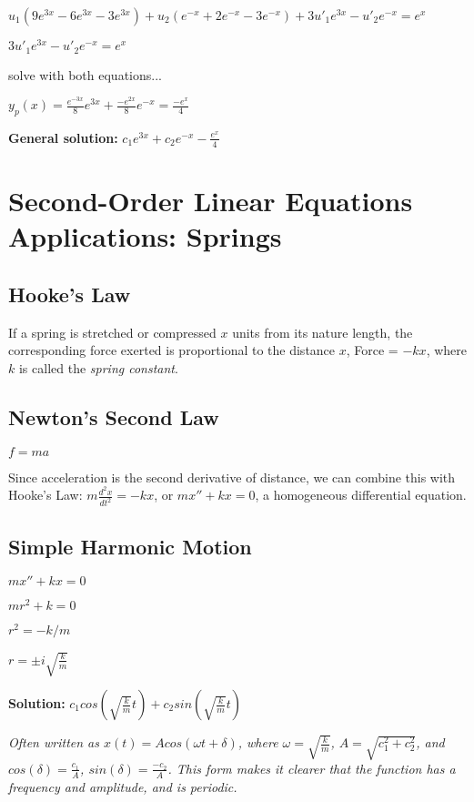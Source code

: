 \documentclass{article}
\begin{document}
$u_1(9e^{3x}-6e^{3x}-3e^{3x})+u_2 (e^{-x}+2e^{-x}-3e^{-x})+3u'_1 e^{3x}-u'_2 e^{-x}= e^{x}$

$3u'_1 e^{3x} - u'_2 e^{-x}=e^x$

solve with both equations...

$y_p(x) = \frac{e^{-3x}}{8}e^{3x}+ \frac{-e^{2x}}{8}e^{-x}= \frac{-e^{x}}{4}$

\textbf{General solution:} $c_1 e^{3x}+ c_2 e^{-x} - \frac{e^x}{4}$

\section{Second-Order Linear Equations Applications: Springs}

\subsection{Hooke's Law}

If a spring is stretched or compressed $x$ units from its nature length, the corresponding force exerted is proportional to the distance $x$, Force = $-kx$, where $k$ is called the \textit{spring constant}.

\subsection{Newton's Second Law}

$f=ma$

Since acceleration is the second derivative of distance, we can combine this with Hooke's Law: $m \frac{d^2 x}{d t^2} = -kx$, or $mx''+kx=0$, a homogeneous differential equation.

\subsection{Simple Harmonic Motion}

$mx''+kx=0$

$mr^2+k=0$

$r^2=-k/m$

$r=\pm i \sqrt{\frac{k}{m}}$

\textbf{Solution:} $c_1 cos(\sqrt{\frac{k}{m}}t)+c_2 sin(\sqrt{\frac{k}{m}}t)$

\textit{Often written as $x(t)=A cos(\omega t+ \delta)$, where $\omega=\sqrt{\frac{k}{m}}$, $A=\sqrt{c_1^2+c_2^2}$, and $cos(\delta) = \frac{c_1}{A}$, $sin(\delta)=\frac{-c_2}{A}$. This form makes it clearer that the function has a frequency and amplitude, and is periodic.}
\end{document}
